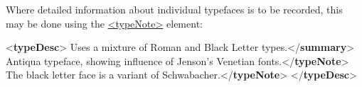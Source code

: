 Where detailed information about individual typefaces is to be recorded, this may be done using the \hyperref[TEI.typeNote]{<typeNote>} element: \par\bgroup{}\exampleFont \begin{shaded}\noindent\mbox{}{<\textbf{typeDesc}>}\mbox{}\newline 
{}Uses a mixture of Roman and Black Letter types.{</\textbf{summary}>}\mbox{}\newline 
{}Antiqua typeface, showing influence of Jenson's Venetian\mbox{}\newline 
\hspace*{1em}\hspace*{1em} fonts.{</\textbf{typeNote}>}\mbox{}\newline 
{}The black letter face is a variant of Schwabacher.{</\textbf{typeNote}>}\mbox{}\newline 
{</\textbf{typeDesc}>}\end{shaded}\egroup\par \par
